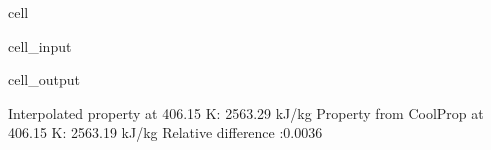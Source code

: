 \documentclass[letterpaper,10pt,english]{jupyterBook}
\begin{document}
\begin{sphinxuseclass}{cell}
\begin{sphinxVerbatimInput}
\begin{sphinxuseclass}{cell_input}
\begin{sphinxVerbatim}[commandchars=\\\{\}]
    
      
 
\end{sphinxVerbatim}

\end{sphinxuseclass}\end{sphinxVerbatimInput}
\begin{sphinxVerbatimOutput}

\begin{sphinxuseclass}{cell_output}
\begin{sphinxVerbatim}[commandchars=\\\{\}]
Interpolated property at 406.15 K: 2563.29 kJ/kg
Property from CoolProp at 406.15 K: 2563.19 kJ/kg
Relative difference :0.0036 \PYGZpc{}
\end{sphinxVerbatim}

\end{sphinxuseclass}\end{sphinxVerbatimOutput}

\end{sphinxuseclass}
\end{document}
